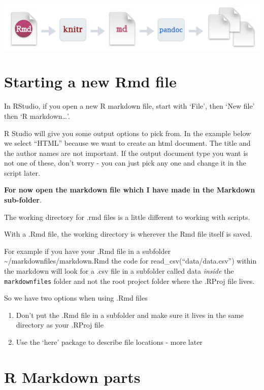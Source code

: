 \documentclass[
]{book}
\makeatletter
\newenvironment{kframe}{%
\medskip{}
\setlength{\fboxsep}{.8em}
 \def\at@end@of@kframe{}%
 \ifinner\ifhmode%
  \def\at@end@of@kframe{\end{minipage}}%
  \begin{minipage}{\columnwidth}%
 \fi\fi%
 \def\FrameCommand##1{\hskip\@totalleftmargin \hskip-\fboxsep
 \colorbox{shadecolor}{##1}\hskip-\fboxsep
     \hskip-\linewidth \hskip-\@totalleftmargin \hskip\columnwidth}%
 \MakeFramed {\advance\hsize-\width
   \@totalleftmargin\z@ \linewidth\hsize
   \@setminipage}}%
 {\par\unskip\endMakeFramed%
 \at@end@of@kframe}
\newenvironment{block}[1]
  {
  \begin{itemize}
  \renewcommand{\labelitemi}{
    \raisebox{-.7\height}[0pt][0pt]{
      {\setkeys{Gin}{width=3em,keepaspectratio}\texttt{[image: images/\#1]}}
    }
  }
  \setlength{\fboxsep}{1em}
  \begin{kframe}
  \item
  }
  {
  \end{kframe}
  \end{itemize}
  }
\newenvironment{rmdwarning}
  {\begin{block}{warning}}
  {\end{block}}
\makeatother
\begin{document}
\includegraphics[width=0.8\linewidth]{images/0_rmd}

\hypertarget{starting-a-new-rmd-file}{%
\section{Starting a new Rmd file}\label{starting-a-new-rmd-file}}

In RStudio, if you open a new R markdown file, start with `File', then `New file' then `R markdown\ldots{}'.

R Studio will give you some output options to pick from. In the example below we select ``HTML'' because we want to create an html document. The title and the author names are not important. If the output document type you want is not one of these, don't worry - you can just pick any one and change it in the script later.

\textbf{For now open the markdown file which I have made in the Markdown sub-folder}.

\begin{rmdwarning}
The working directory for .rmd files is a little different to working
with scripts.

With a .Rmd file, the working directory is wherever the Rmd file itself
is saved.

For example if you have your .Rmd file in a subfolder
\textasciitilde/markdownfiles/markdown.Rmd the code for
read\_csv(``data/data.csv'') within the markdown will look for a .csv
file in a subfolder called data \emph{inside} the \texttt{markdownfiles}
folder and not the root project folder where the .RProj file lives.

So we have two options when using .Rmd files

\begin{enumerate}
\def\labelenumi{\arabic{enumi})}
\item
  Don't put the .Rmd file in a subfolder and make sure it lives in the
  same directory as your .RProj file
\item
  Use the `here' package to describe file locations - more later
\end{enumerate}
\end{rmdwarning}

\hypertarget{r-markdown-parts}{%
\section{R Markdown parts}\label{r-markdown-parts}}
\end{document}
